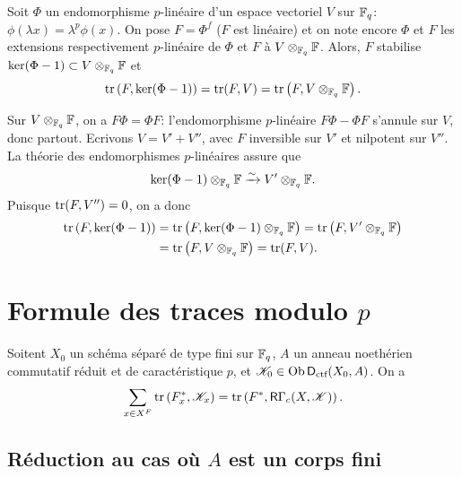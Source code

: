 \begin{lemma_}\label{III:3-8}
Soit $\Phi$ un endomorphisme $p$-linéaire d'un espace vectoriel $V$ sur 
$\mathbb{F}_q$: $\phi(\lambda x) = \lambda^p\phi(x)$. On pose $F=\Phi^f$ ($F$ est 
linéaire) et on note encore $\Phi$ et $F$ les extensions respectivement 
$p$-linéaire de $\Phi$ et $F$ à $V\otimes_{\mathbb{F}_q}\mathbb{F}$. Alors, $F$ stabilise 
$\ker(\Phi-1)\subset V\otimes_{\mathbb{F}_q}\mathbb{F}$ et 
\[
  \operatorname{tr}\left(F,\ker(\Phi-1)\right) = \operatorname{tr}(F,V) = \operatorname{tr}\left(F,V\otimes_{\mathbb{F}_q}\mathbb{F}\right) \text{.}
\]
\end{lemma_}

Sur $V\otimes_{\mathbb{F}_q}\mathbb{F}$, on a $F\Phi = \Phi F$: l'endomorphisme $p$-linéaire 
$F\Phi-\Phi F$ s'annule sur $V$, donc partout. Ecrivons $V=V'+V''$, avec $F$ 
inversible sur $V'$ et nilpotent sur $V''$. La théorie des endomorphismes 
$p$-linéaires assure que 
\[
  \ker(\Phi-1)\otimes_{\mathbb{F}_q}\mathbb{F} \xrightarrow\sim V'\otimes_{\mathbb{F}_q}\mathbb{F} \text{.}
\]
Puisque $\operatorname{tr}(F,V'') = 0$, on a donc 
\begin{align*}
  \operatorname{tr}\left(F,\ker(\Phi-1)\right) 
    &= \operatorname{tr}\left(F,\ker(\Phi-1)\otimes_{\mathbb{F}_q}\mathbb{F}\right) = \operatorname{tr}\left(F,V'\otimes_{\mathbb{F}_q}\mathbb{F}\right) \\
    &= \operatorname{tr}\left(F,V\otimes_{\mathbb{F}_q}\mathbb{F}\right) = \operatorname{tr}(F,V) \text{.}
\end{align*}










\section{Formule des traces modulo \texorpdfstring{$p$}{p}}\label{III:4}





\begin{theorem_}\label{III:4-1}
Soitent $X_0$ un schéma séparé de type fini sur $\mathbb{F}_q$, $A$ un anneau 
noethérien commutatif réduit et de caractéristique $p$, et 
$\mathscr{K}_0\in\operatorname{Ob}\mathsf{D}_\textnormal{ctf}(X_0,A)$. On a 
\begin{equation}\label{III:eq:4-1-1}
  \sum_{x\in X^F} \operatorname{tr}\left(F_x^*,\mathscr{K}_x\right) = \operatorname{tr}\left(F^*,\mathsf{R}\Gamma_c(X,\mathscr{K})\right) \text{.}
\end{equation}
\end{theorem_}





\subsection{Réduction au cas où \texorpdfstring{$A$}{A} est un corps fini}\label{III:4-2}


